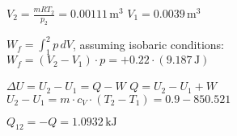 \( V_2 = \frac{m R T_2}{p_2} = 0.00111 \, \text{m}^3 \)  
\( V_1 = 0.0039 \, \text{m}^3 \)  

\( W_f = \int_1^2 p \, dV \), assuming isobaric conditions:  
\( W_f = (V_2 - V_1) \cdot p = +0.22 \cdot (9.187 \, \text{J}) \)  

\( \Delta U = U_2 - U_1 = Q - W \)  
\( Q = U_2 - U_1 + W \)  
\( U_2 - U_1 = m \cdot c_V \cdot (T_2 - T_1) = 0.9 - 850.521 \)  

\( Q_{12} = -Q = 1.0932 \, \text{kJ} \)